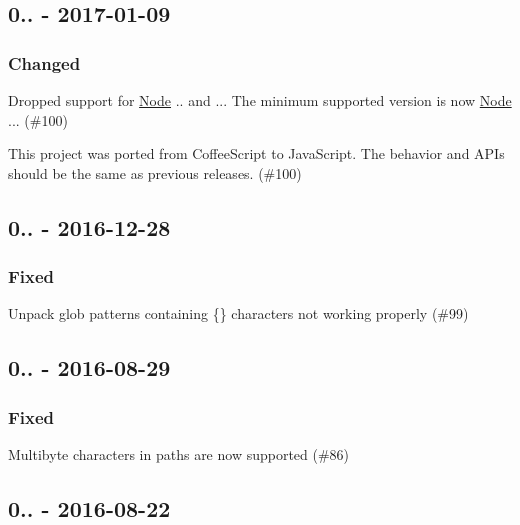 \subsection*{0.. -\/ 2017-\/01-\/09}

\subsubsection*{Changed}


\begin{DoxyItemize}
\item Dropped support for \mbox{\hyperlink{classNode}{Node}} {..} and {..}. The minimum supported version is now \mbox{\hyperlink{classNode}{Node}} {..}. (\#100)
\item This project was ported from Coffee\+Script to Java\+Script. The behavior and A\+P\+Is should be the same as previous releases. (\#100)
\end{DoxyItemize}

\subsection*{0.. -\/ 2016-\/12-\/28}

\subsubsection*{Fixed}


\begin{DoxyItemize}
\item Unpack glob patterns containing {\ttfamily \{\}} characters not working properly (\#99)
\end{DoxyItemize}

\subsection*{0.. -\/ 2016-\/08-\/29}

\subsubsection*{Fixed}


\begin{DoxyItemize}
\item Multibyte characters in paths are now supported (\#86)
\end{DoxyItemize}

\subsection*{0.. -\/ 2016-\/08-\/22}

